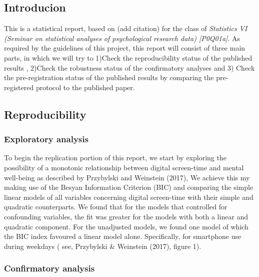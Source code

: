 \documentclass[man]{apa6}
\author{Gustavo Villca Ponce\textsuperscript{1}, MohammadHossein Haqiqatkhah\textsuperscript{2}, \& Sigert Ariens\textsuperscript{3}}
\affiliation{
    \vspace{0.5cm}
          \textsuperscript{1} student number:r0292033\\
          \textsuperscript{2} student number:r0607671\\
          \textsuperscript{3} student number:  }
\theoremstyle{definition}
\theoremstyle{definition}
\theoremstyle{definition}
\theoremstyle{remark}
\begin{document}
\maketitle

\setcounter{secnumdepth}{0}



\subsection{Introducion}\label{introducion}

This is a statistical report, based on (add citation) for the class of
\emph{Statistics VI (Seminar on statistical analyses of psychological
research data) {[}P0Q01a{]}}. As required by the guidelines of this
project, this report will consist of three main parts, in which we will
try to 1)Check the reproducibility status of the published results ,
2)Check the robustness status of the confirmatory analyses and 3) Check
the pre-registration status of the published results by comparing the
pre-registered protocol to the published paper.

\subsection{Reproducibility}\label{reproducibility}

\subsubsection{Exploratory analysis}\label{exploratory-analysis}

To begin the replication portion of this report, we start by exploring
the possibility of a monotonic relationship between digital screen-time
and mental well-being as described by Przybylski and Weinstein (2017),
We achieve this my making use of the Besyan Information Criterion (BIC)
and comparing the simple linear models of all variables concerning
digital screen-time with their simple and quadratic counterparts. We
found that for the models that controlled for confounding variables, the
fit was greater for the models with both a linear and quadratic
component. For the unadjusted models, we found one model of which the
BIC index favoured a linear model alone. Specifically, for smartphone
use during weekdays ( see, Przybylski \& Weinstein (2017), figure 1).

\subsubsection{Confirmatory analysis}\label{confirmatory-analysis}
\end{document}
